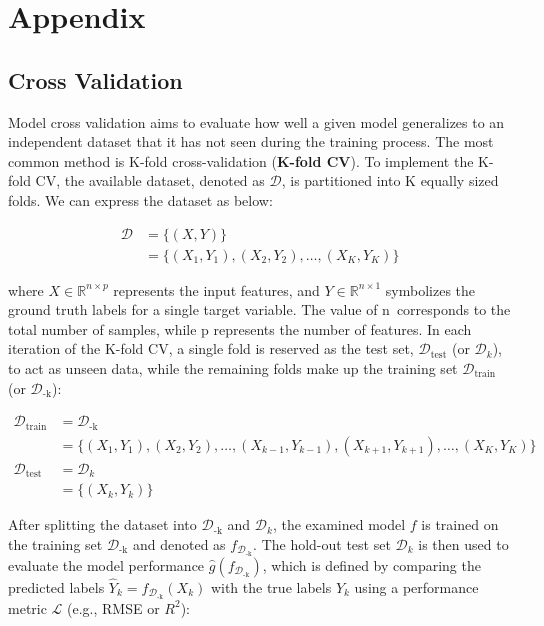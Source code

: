 \section*{Appendix}

\subsection*{Cross Validation}

Model cross validation aims to evaluate how well a given model generalizes to an independent dataset that it has not seen during the training process. The most common method is K-fold cross-validation (\textbf{K-fold CV}). To implement the K-fold CV, the available dataset, denoted as $\mathcal{D}$, is partitioned into K equally sized folds. We can express the dataset as below:


\begin{equation} \label{eq_datasplit}
\begin{split}
    \mathcal{D} & = \{(X, Y)\} \\
    & = \{(X_1, Y_1), (X_2, Y_2), \dots, (X_K, Y_K)\}
\end{split}
\end{equation}

where $X\in\mathbb{R}^{n\times p}$ represents the input features, and $Y\in\mathbb{R}^{n\times1}$ symbolizes the ground truth labels for a single target variable. The value of n\ corresponds to the total number of samples, while p represents the number of features. In each iteration of the K-fold CV, a single fold is reserved as the test set, $\mathcal{D}_{\mathrm{test}}$ (or $\mathcal{D}_k$), to act as unseen data, while the remaining folds make up the training set $\mathcal{D}_{\mathrm{train}}$ (or $\mathcal{D}_\text{-k}$):

\begin{equation} \label{eq_traintest}
\begin{split}
    \mathcal{D}_{\text{train}} &= \mathcal{D}_{\text{-k}} \\
    &= \{(X_1, Y_1), (X_2, Y_2), \dots, (X_{k-1}, Y_{k-1}), (X_{k+1}, Y_{k+1}), \dots, (X_K, Y_K)\}\\
    \mathcal{D}_{\text{test}} &= \mathcal{D}_{k} \\
    &= \{(X_k, Y_k)\}
\end{split}
\end{equation}

After splitting the dataset into $\mathcal{D}_\text{-k}$ and $\mathcal{D}_k$, the examined model $f$ is trained on the training set $\mathcal{D}_\text{-k}$ and denoted as $f_{\mathcal{D}_{\text{-k}}}$. The hold-out test set $\mathcal{D}_k$ is then used to evaluate the model performance $\hat{g}\left(f_{\mathcal{D}_{\text{-k}}}\right)$, which is defined by comparing the predicted labels $\hat{Y}_{k} = f_{\mathcal{D}_{\text{-k}}}(X_k)$ with the true labels $Y_k$ using a performance metric $\mathcal{L}$ (e.g., RMSE or $R^2$):

